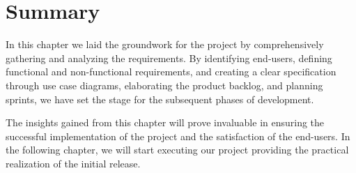 \pagebreak
{}
\section*{Summary}
In this chapter we laid the groundwork for the project by comprehensively gathering and analyzing
the requirements. By identifying end-users, defining functional and non-functional requirements,
and creating a clear specification through use case diagrams, elaborating the product backlog,
and planning sprints, we have set the stage for the subsequent phases of development.

The insights gained from this chapter will prove invaluable in ensuring the successful implementation
of the project and the satisfaction of the end-users. In the following chapter, we will start executing
our project providing the practical realization of the initial release.

